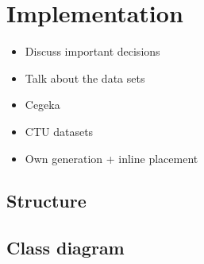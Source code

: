 
\chapter{Implementation} %

\label{implementation} %

\begin{itemize}
\item Discuss important decisions
\item Talk about the data sets
\end{itemize}

\begin{itemize}
\item Cegeka
\item CTU datasets
\item Own generation + inline placement
\end{itemize}

\section{Structure}

\section{Class diagram}
